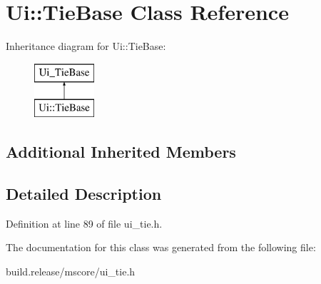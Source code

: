 \hypertarget{class_ui_1_1_tie_base}{}\section{Ui\+:\+:Tie\+Base Class Reference}
\label{class_ui_1_1_tie_base}
Inheritance diagram for Ui\+:\+:Tie\+Base\+:\begin{figure}[H]
\begin{center}
\leavevmode
\includegraphics[height=2.000000cm]{class_ui_1_1_tie_base}
\end{center}
\end{figure}
\subsection*{Additional Inherited Members}


\subsection{Detailed Description}


Definition at line 89 of file ui\+\_\+tie.\+h.



The documentation for this class was generated from the following file\+:\begin{DoxyCompactItemize}
\item 
build.\+release/mscore/ui\+\_\+tie.\+h\end{DoxyCompactItemize}

